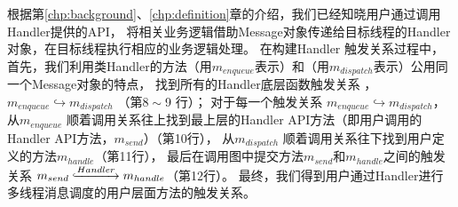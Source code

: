 
根据第\ref{chp:background}、\ref{chp:definition}章的介绍，我们已经知晓用户通过调用Handler提供的API，
将相关业务逻辑借助Message对象传递给目标线程的Handler对象，在目标线程执行相应的业务逻辑处理。
在构建{Handler} 触发关系过程中，首先，我们利用类{Handler}的方法（用$m_{enqueue}$表示）和（用$m_{dispatch}$表示）公用同一个Message对象的特点，
找到所有的Handler底层函数触发关系 ，$m_{enqueue}  \hookrightarrow  m_{dispatch}$ （第$8\sim$9 行）；
对于每一个触发关系 $m_{enqueue}  \hookrightarrow  m_{dispatch}$，
从$m_{enqueue}$ 顺着调用关系往上找到最上层的Handler API方法（即用户调用的Handler API方法，$m_{send}$）（第10行），
从$m_{dispatch}$ 顺着调用关系往下找到用户定义的方法$m_{handle}$（第11行），
最后在调用图中提交方法$m_{send}$和$m_{handle}$之间的触发关系 $m_{send} \lhook\joinrel\xrightarrow{Handler} m_{handle}$（第12行）。
最终，我们得到用户通过Handler进行多线程消息调度的用户层面方法的触发关系。


